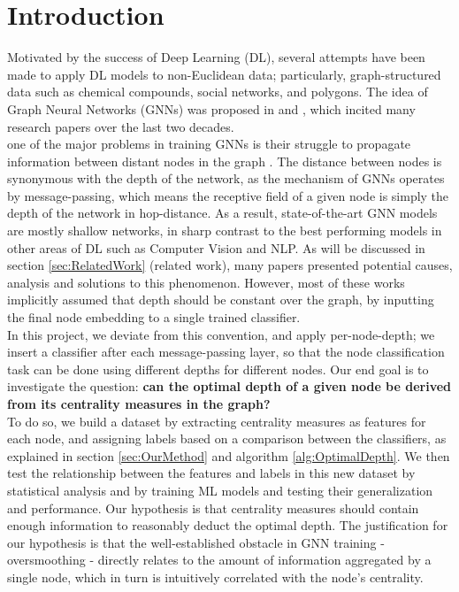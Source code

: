 \documentclass[11pt,a4paper]{article}
\begin{document}
\section{Introduction}
\label{sec:Introduction}
	Motivated by the success of Deep Learning (DL), several attempts have been made to apply DL models to non-Euclidean data; particularly, graph-structured data such as chemical compounds, social networks, and polygons. The idea of Graph Neural Networks (GNNs) was proposed in \cite{gori2005new} and \cite{scarselli2008graph}, which incited many research papers over the last two decades.\\
	one of the major problems in training GNNs is their struggle to propagate information between distant nodes in the graph \citep{alon2020bottleneck}. The distance between nodes is synonymous with the depth of the network, as the mechanism of GNNs operates by message-passing, which means the receptive field of a given node is simply the depth of the network in hop-distance. As a result, state-of-the-art GNN models are mostly shallow networks, in sharp contrast to the best performing models in other areas of DL such as Computer Vision and NLP. As will be discussed in section \ref{sec:RelatedWork} (related work), many papers presented potential causes, analysis and solutions to this phenomenon. However, most of these works implicitly assumed that depth should be constant over the graph, by inputting the final node embedding to a single trained classifier.\\
	In this project, we deviate from this convention, and apply per-node-depth; we insert a classifier after each message-passing layer, so that the node classification task can be done using different depths for different nodes. Our end goal is to investigate the question: \textbf{can the optimal depth of a given node be derived from its centrality measures in the graph?}\\
	To do so, we build a dataset by extracting centrality measures as features for each node, and assigning labels based on a comparison between the classifiers, as explained in section \ref{sec:OurMethod} and algorithm \ref{alg:OptimalDepth}. We then test the relationship between the features and labels in this new dataset by statistical analysis and by training ML models and testing their generalization and performance.
	Our hypothesis is that centrality measures should contain enough information to reasonably deduct the optimal depth. The justification for our hypothesis is that the well-established obstacle in GNN training - oversmoothing - directly relates to the amount of information aggregated by a single node, which in turn is intuitively correlated with the node's centrality.
	
\end{document}
